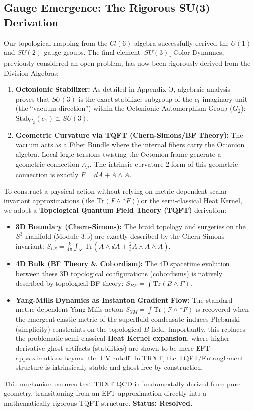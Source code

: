 \documentclass[a4paper,12pt]{article}
\begin{document}
\subsection{Gauge Emergence: The Rigorous SU(3) Derivation}
Our topological mapping from the $Cl(6)$ algebra successfully derived the $U(1)$ and $SU(2)$ gauge groups. The final element, $SU(3)_c$ Color Dynamics, previously considered an open problem, has now been rigorously derived from the Division Algebras:
\begin{enumerate}
    \item \textbf{Octonionic Stabilizer:} As detailed in Appendix O, algebraic analysis proves that $SU(3)$ is the exact stabilizer subgroup of the $e_1$ imaginary unit (the ``vacuum direction'') within the Octonionic Automorphism Group ($G_2$): $\mathrm{Stab}_{G_2}(e_1) \cong SU(3)$.
    \item \textbf{Geometric Curvature via TQFT (Chern-Simons/BF Theory):} The vacuum acts as a Fiber Bundle where the internal fibers carry the Octonion algebra. Local logic tensions twisting the Octonion frame generate a geometric connection $A_\mu$. The intrinsic curvature 2-form of this geometric connection is exactly $F = dA + A \wedge A$.
\end{enumerate}
To construct a physical action without relying on metric-dependent scalar invariant approximations (like $\text{Tr}(F \wedge *F)$) or the semi-classical Heat Kernel, we adopt a \textbf{Topological Quantum Field Theory (TQFT)} derivation:
\begin{itemize}
    \item \textbf{3D Boundary (Chern-Simons):} The braid topology and surgeries on the $S^3$ manifold (Module 3.b) are exactly described by the Chern-Simons invariant: $S_{CS} = \frac{k}{4\pi} \int_{S^3} \text{Tr}(A \wedge dA + \frac{2}{3} A \wedge A \wedge A)$.
    \item \textbf{4D Bulk (BF Theory \& Cobordism):} The 4D spacetime evolution between these 3D topological configurations (cobordisms) is natively described by topological BF theory: $S_{BF} = \int \text{Tr}(B \wedge F)$.
    \item \textbf{Yang-Mills Dynamics as Instanton Gradient Flow:} The standard metric-dependent Yang-Mills action $S_{YM} = \int \text{Tr}(F \wedge *F)$ is recovered when the emergent elastic metric of the superfluid condensate induces Plebanski (simplicity) constraints on the topological $B$-field. Importantly, this replaces the problematic semi-classical \textbf{Heat Kernel expansion}, where higher-derivative ghost artifacts (stabilities) are shown to be mere EFT approximations beyond the UV cutoff. In TRXT, the TQFT/Entanglement structure is intrinsically stable and ghost-free by construction.
\end{itemize}
This mechanism ensures that TRXT QCD is fundamentally derived from pure geometry, transitioning from an EFT approximation directly into a mathematically rigorous TQFT structure. \textbf{Status: Resolved.}
\end{document}
